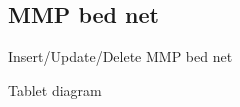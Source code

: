 \documentclass[letterpaper,10pt,english,openany,oneside]{sphinxmanual}
\begin{document}
\subsection{MMP bed net}
\label{\detokenize{module/module:mmp-bed-net}}
\sphinxAtStartPar
Insert/Update/Delete MMP bed net

\sphinxAtStartPar
Tablet diagram

\begin{sphinxVerbatim}[commandchars=\\\{\}]
    
                              
     
                              
    
\end{sphinxVerbatim}
\end{document}
